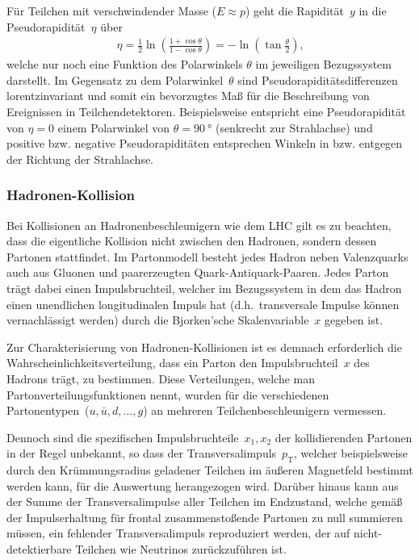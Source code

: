\documentclass[11pt, a4paper]{article}
\numberwithin{equation}{section}
\begin{document}
Für Teilchen mit verschwindender Masse ($E \approx p$) geht die Rapidität~$y$ in die Pseudorapidität~$\eta$ über \cite{script}
\begin{align}
	\eta = \frac{1}{2} \ln\left( \frac{1 + \cos\theta}{1 - \cos\theta} \right) = - \ln\left( \tan\frac{\theta}{2} \right)\text{,}
	\label{eq:pseudorapidity}
\end{align}
welche nur noch eine Funktion des Polarwinkels $\theta$ im jeweiligen Bezugssystem darstellt.
Im Gegensatz zu dem Polarwinkel~$\theta$ sind Pseudorapiditätsdifferenzen lorentzinvariant und somit ein bevorzugtes Maß für die Beschreibung von Ereignissen in Teilchendetektoren.
Beispielsweise entspricht eine Pseudorapidität von $\eta = \num{0}$ einem Polarwinkel von $\theta = \SI{90}{\degree}$ (senkrecht zur Strahlachse) und positive bzw. negative Pseudorapiditäten entsprechen Winkeln in bzw. entgegen der Richtung der Strahlachse.

\subsubsection{Hadronen-Kollision}
\label{sssec:hadronen_kollision}
Bei Kollisionen an Hadronenbeschleunigern wie dem LHC gilt es zu beachten, dass die eigentliche Kollision nicht zwischen den Hadronen, sondern dessen Partonen stattfindet.
Im Partonmodell besteht jedes Hadron neben Valenzquarks auch aus Gluonen und paarerzeugten Quark-Antiquark-Paaren.
Jedes Parton trägt dabei einen Impulsbruchteil, welcher im Bezugssystem in dem das Hadron einen unendlichen longitudinalen Impuls hat (d.h.\ transversale Impulse können vernachlässigt werden) durch die Bjorken'sche Skalenvariable~$x$ gegeben ist.

Zur Charakterisierung von Hadronen-Kollisionen ist es demnach erforderlich die Wahrscheinlichkeitsverteilung, dass ein Parton den Impulsbruchteil~$x$ des Hadrons trägt, zu bestimmen.
Diese Verteilungen, welche man Partonverteilungsfunktionen nennt, wurden für die verschiedenen Partonentypen~($u, \bar{u}, d, \dots, g$) an mehreren Teilchenbeschleunigern vermessen.

Dennoch sind die spezifischen Impulsbruchteile~$x_1, x_2$ der kollidierenden Partonen in der Regel unbekannt, so dass der Transversalimpuls~$p_\mathrm{T}$, welcher beispielsweise durch den Krümmungsradius geladener Teilchen im äußeren Magnetfeld bestimmt werden kann, für die Auswertung herangezogen wird.
Darüber hinaus kann aus der Summe der Transversalimpulse aller Teilchen im Endzustand, welche gemäß der Impulserhaltung für frontal zusammenstoßende Partonen zu null summieren müssen, ein fehlender Transversalimpuls reproduziert werden, der auf nicht-detektierbare Teilchen wie Neutrinos zurückzuführen ist.
\end{document}
